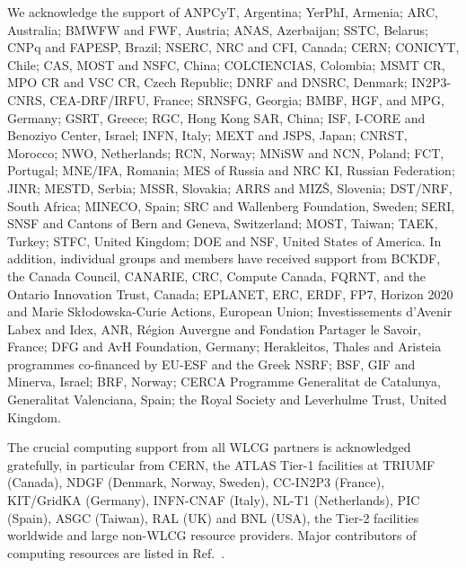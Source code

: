 \documentclass[PAPER, atlasdraft=true, texlive=2016, UKenglish,coverpage]{\ATLASLATEXPATH atlasdoc}
\begin{document}
We acknowledge the support of ANPCyT, Argentina; YerPhI, Armenia; ARC, Australia; BMWFW and FWF, Austria; ANAS, Azerbaijan; SSTC, Belarus; CNPq and FAPESP, Brazil; NSERC, NRC and CFI, Canada; CERN; CONICYT, Chile; CAS, MOST and NSFC, China; COLCIENCIAS, Colombia; MSMT CR, MPO CR and VSC CR, Czech Republic; DNRF and DNSRC, Denmark; IN2P3-CNRS, CEA-DRF/IRFU, France; SRNSFG, Georgia; BMBF, HGF, and MPG, Germany; GSRT, Greece; RGC, Hong Kong SAR, China; ISF, I-CORE and Benoziyo Center, Israel; INFN, Italy; MEXT and JSPS, Japan; CNRST, Morocco; NWO, Netherlands; RCN, Norway; MNiSW and NCN, Poland; FCT, Portugal; MNE/IFA, Romania; MES of Russia and NRC KI, Russian Federation; JINR; MESTD, Serbia; MSSR, Slovakia; ARRS and MIZ\v{S}, Slovenia; DST/NRF, South Africa; MINECO, Spain; SRC and Wallenberg Foundation, Sweden; SERI, SNSF and Cantons of Bern and Geneva, Switzerland; MOST, Taiwan; TAEK, Turkey; STFC, United Kingdom; DOE and NSF, United States of America. In addition, individual groups and members have received support from BCKDF, the Canada Council, CANARIE, CRC, Compute Canada, FQRNT, and the Ontario Innovation Trust, Canada; EPLANET, ERC, ERDF, FP7, Horizon 2020 and Marie Sk{\l}odowska-Curie Actions, European Union; Investissements d'Avenir Labex and Idex, ANR, R{\'e}gion Auvergne and Fondation Partager le Savoir, France; DFG and AvH Foundation, Germany; Herakleitos, Thales and Aristeia programmes co-financed by EU-ESF and the Greek NSRF; BSF, GIF and Minerva, Israel; BRF, Norway; CERCA Programme Generalitat de Catalunya, Generalitat Valenciana, Spain; the Royal Society and Leverhulme Trust, United Kingdom.

The crucial computing support from all WLCG partners is acknowledged gratefully, in particular from CERN, the ATLAS Tier-1 facilities at TRIUMF (Canada), NDGF (Denmark, Norway, Sweden), CC-IN2P3 (France), KIT/GridKA (Germany), INFN-CNAF (Italy), NL-T1 (Netherlands), PIC (Spain), ASGC (Taiwan), RAL (UK) and BNL (USA), the Tier-2 facilities worldwide and large non-WLCG resource providers. Major contributors of computing resources are listed in Ref.~\cite{ATL-GEN-PUB-2016-002}.



\clearpage
\end{document}
